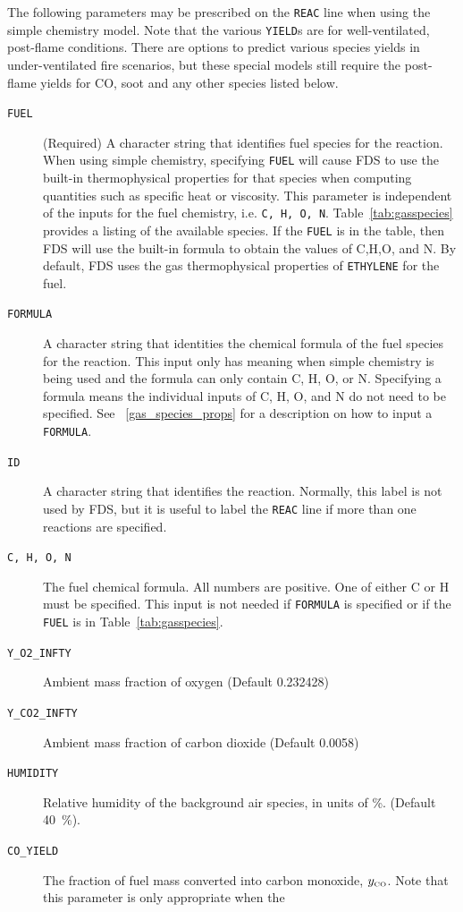 \documentclass[11pt]{book}
\newcommand{\ct}{\tt\small}
\newcommand{\CO}{{\tiny \hbox{CO}}}
\begin{document}
\noindent The following parameters may be prescribed on the {\ct REAC} line when using the simple chemistry model.
Note that the various {\ct YIELD}s are for well-ventilated, post-flame conditions. There are options to
predict various species yields in under-ventilated fire scenarios, but these special models still require
the post-flame yields for CO, soot and any other species listed below.
\begin{description}
\item[{\ct FUEL}] (Required) A character string that identifies fuel species for the reaction. When using simple chemistry, specifying {\ct FUEL} will
cause FDS to use the built-in thermophysical properties for that species when computing quantities such as specific heat or viscosity.
This parameter is independent of the inputs for the fuel chemistry, i.e. {\ct C, H, O, N}. Table~\ref{tab:gasspecies} provides a listing of the available species.
If the {\ct FUEL} is in the table, then FDS will use the built-in formula to obtain the values of C,H,O, and N.
By default, FDS uses the gas thermophysical properties of {\ct ETHYLENE} for the fuel.
\item[{\ct FORMULA}] A character string that identities the chemical formula of the fuel species for the reaction.
This input only has meaning when simple chemistry is being used and the formula can only contain C, H, O, or N.
Specifying a formula means the individual inputs of C, H, O, and N do not need to be specified. See ~\ref{gas_species_props} for a description on how to input a {\ct FORMULA}.
\item[{\ct ID}] A character string that identifies the reaction. Normally, this label is not used by FDS, but it is useful to
label the {\ct REAC} line if more than one reactions are specified.
\item[{\ct C, H, O, N}] The fuel chemical formula. All numbers are positive.  One of either C or H must be specified.
This input is not needed if {\ct FORMULA} is specified or if the {\ct FUEL} is in Table~\ref{tab:gasspecies}.
\item[{\ct Y\_O2\_INFTY}] Ambient mass fraction of oxygen (Default 0.232428)
\item[{\ct Y\_CO2\_INFTY}] Ambient mass fraction of carbon dioxide (Default 0.0058)
\item[{\ct HUMIDITY}] Relative humidity of the background air species, in units of \%. (Default 40~\%).
\item[{\ct CO\_YIELD}] The fraction of fuel mass converted into carbon monoxide, $y_{\CO}$. Note that this parameter is only appropriate when the

\end{description}
\end{document}
